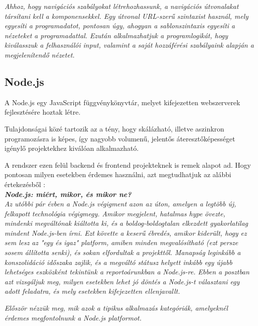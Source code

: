 \textit{Ahhoz, hogy navigációs szabályokat létrehozhassunk, a navigációs útvonalakat társítani kell a komponensekkel. Egy útvonal URL-szerű szintaxist használ, mely egyesíti a programadatot, pontosan úgy, ahogyan a sablonszintaxis egyesíti a nézeteket a programadattal. Ezután alkalmazhatjuk a programlogikát, hogy kiválasszuk a felhasználói input, valamint a saját hozzáférési szabályaink alapján a megjelenítendő nézetet.}


\subsection{Node.js}

A Node.js egy JavaScript függvénykönyvtár, melyet kifejezetten webszerverek fejlesztésére hoztak létre. 

Tulajdonságai közé tartozik az a tény, hogy skálázható, illetve aszinkron programozásra is képes, így nagyobb volumenű, jelentős áteresztőképességet igénylő projektekhez kiválóan alkalmazható.

A rendszer ezen felül backend és frontend projekteknek is remek alapot ad. Hogy pontosan milyen esetekben érdemes használni, azt megtudhatjuk az alábbi értekezésből \cite{nodejscikk}:\\

\noindent\textit{\textbf{\large{Node.js: miért, mikor, és mikor ne?}}}\\

\textit{Az utóbbi pár évben a Node.js végigment azon az úton, amelyen a legtöbb új, felkapott technológia végigmegy. Amikor megjelent, hatalmas hype övezte, mindenki megváltónak kiáltotta ki, és a boldog-boldogtalan elkezdett gyakorlatilag mindent Node.js-ben írni. Ezt követte a keserű ébredés, amikor kiderült, hogy ez sem lesz az "egy és igaz" platform, amiben minden megvalósítható (ezt persze sosem állította senki), és sokan elfordultak a projekttől. Manapság leginkább a konszolidáció időszaka zajlik, és a megváltó státusz helyett inkább egy újabb lehetséges eszközként tekintünk a reportoárunkban a Node.js-re. Ebben a posztban azt vizsgáljuk meg, milyen esetekben lehet jó döntés a Node.js-t választani egy adott feladatra, és mely esetekben kifejezetten ellenjavallt.}

\textit{Először nézzük meg, mik azok a tipikus alkalmazás kategóriák, amelyeknél érdemes megfontolnunk a Node.js platformot.}\\

